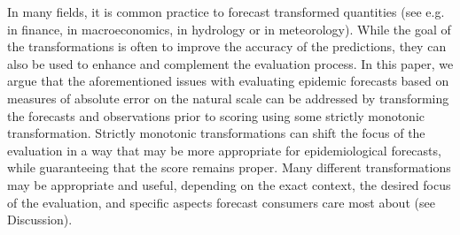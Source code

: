 \documentclass[10pt,letterpaper]{article}
\begin{document}
In many fields, it is common practice to forecast transformed quantities (see e.g. \cite{taylorEvaluatingVolatilityInterval1999} in finance, \cite{mayrLogLevelVAR2015} in macroeconomics, \cite{loweStochasticRainfallrunoffForecasting2014} in hydrology or \cite{fuglstadDoesNonstationarySpatial2015} in meteorology). While the goal of the transformations is often to improve the accuracy of the predictions, they can also be used to enhance and complement the evaluation process. 
In this paper, we argue that the aforementioned issues with evaluating epidemic forecasts based on measures of absolute error on the natural scale can be addressed by transforming the forecasts and observations prior to scoring using some strictly monotonic transformation. Strictly monotonic transformations can shift the focus of the evaluation in a way that may be more appropriate for epidemiological forecasts, while guaranteeing that the score remains proper. Many different transformations may be appropriate and useful, depending on the exact context, the desired focus of the evaluation, and specific aspects forecast consumers care most about (see Discussion). 
\end{document}

